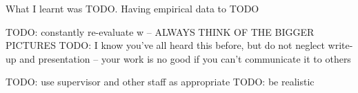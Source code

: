 What I learnt was TODO. Having empirical data to TODO 



TODO: constantly re-evaluate w -- ALWAYS THINK OF THE BIGGER PICTURES
TODO: I know you've all heard this before, but do not neglect write-up and presentation -- your work is no good if you can't communicate it to others

TODO: use supervisor and other staff as appropriate
TODO: be realistic
